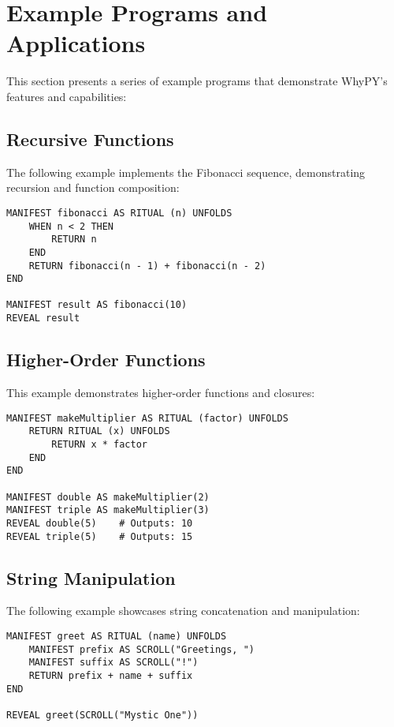 \documentclass[11pt]{article}
\newenvironment{feature}
{\begin{tcolorbox}[
    colback=lightgray,
    colframe=primary,
    arc=0mm,
    boxrule=1pt
]}
{\end{tcolorbox}}
\begin{document}
\section{Example Programs and Applications}
\begin{feature}
This section presents a series of example programs that demonstrate WhyPY's features and capabilities:

\subsection*{Recursive Functions}
The following example implements the Fibonacci sequence, demonstrating recursion and function composition:

\begin{lstlisting}
MANIFEST fibonacci AS RITUAL (n) UNFOLDS
    WHEN n < 2 THEN
        RETURN n
    END
    RETURN fibonacci(n - 1) + fibonacci(n - 2)
END

MANIFEST result AS fibonacci(10)
REVEAL result
\end{lstlisting}
\end{feature}

\subsection{Higher-Order Functions}
\begin{feature}
This example demonstrates higher-order functions and closures:

\begin{lstlisting}
MANIFEST makeMultiplier AS RITUAL (factor) UNFOLDS
    RETURN RITUAL (x) UNFOLDS
        RETURN x * factor
    END
END

MANIFEST double AS makeMultiplier(2)
MANIFEST triple AS makeMultiplier(3)
REVEAL double(5)    # Outputs: 10
REVEAL triple(5)    # Outputs: 15
\end{lstlisting}
\end{feature}

\subsection{String Manipulation}
The following example showcases string concatenation and manipulation:

\begin{verbatim}
MANIFEST greet AS RITUAL (name) UNFOLDS
    MANIFEST prefix AS SCROLL("Greetings, ")
    MANIFEST suffix AS SCROLL("!")
    RETURN prefix + name + suffix
END

REVEAL greet(SCROLL("Mystic One"))
\end{verbatim}
\end{document}
